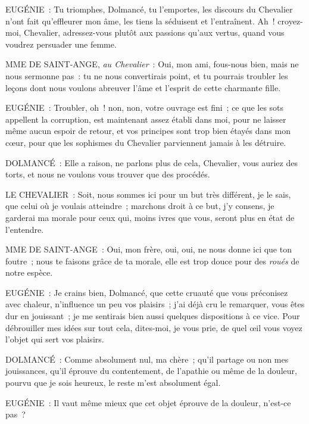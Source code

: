 \documentclass[french,twoside]{book} %
\begin{document}
EUGÉNIE : Tu triomphes, Dolmancé, tu l’emportes, les discours du Chevalier n’ont fait qu’effleurer mon âme, les tiens la séduisent et l’entraînent. Ah ! croyez-moi, Chevalier, adressez-vous plutôt aux passions qu’aux vertus, quand vous voudrez persuader une femme.\par
MME DE SAINT-ANGE, {\itshape au Chevalier} : Oui, mon ami, fous-nous bien, mais ne nous sermonne pas : tu ne nous convertirais point, et tu pourrais troubler les leçons dont nous voulons abreuver l’âme et l’esprit de cette charmante fille.\par
EUGÉNIE : Troubler, oh ! non, non, votre ouvrage est fini ; ce que les sots appellent la corruption, est maintenant assez établi dans moi, pour ne laisser même aucun espoir de retour, et vos principes sont trop bien étayés dans mon cœur, pour que les sophismes du Chevalier parviennent jamais à les détruire.\par
DOLMANCÉ : Elle a raison, ne parlons plus de cela, Chevalier, vous auriez des torts, et nous ne voulons vous trouver que des procédés.\par
LE CHEVALIER : Soit, nous sommes ici pour un but très différent, je le sais, que celui où je voulais atteindre ; marchons droit à ce but, j’y consens, je garderai ma morale pour ceux qui, moins ivres que vous, seront plus en état de l’entendre.\par
MME DE SAINT-ANGE : Oui, mon frère, oui, oui, ne nous donne ici que ton foutre ; nous te faisons grâce de ta morale, elle est trop douce pour des {\itshape roués} de notre espèce.\par
EUGÉNIE : Je crains bien, Dolmancé, que cette cruauté que vous préconisez avec chaleur, n’influence un peu vos plaisirs ; j’ai déjà cru le remarquer, vous êtes dur en jouissant ; je me sentirais bien aussi quelques dispositions à ce vice. Pour débrouiller mes idées sur tout cela, dites-moi, je vous prie, de quel œil vous voyez l’objet qui sert vos plaisirs.\par
DOLMANCÉ : Comme absolument nul, ma chère ; qu’il partage ou non mes jouissances, qu’il éprouve du contentement, de l’apathie ou même de la douleur, pourvu que je sois heureux, le reste m’est absolument égal.\par
EUGÉNIE : Il vaut même mieux que cet objet éprouve de la douleur, n’est-ce pas ?\par
\end{document}
